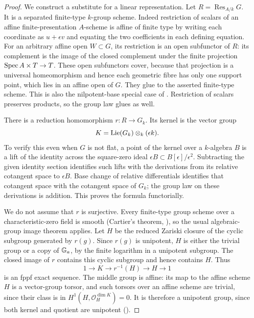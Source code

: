 \begin{proof}
We construct a substitute for a linear representation.
Let $R=\operatorname{Res}_{A/k}G$. It is a separated
finite-type $k$-group scheme. Indeed restriction of
scalars of an affine finite-presentation $A$-scheme
is affine of finite type by writing each coordinate
as $u+\epsilon v$ and equating the two coefficients
in each defining equation. For an arbitrary affine
open $W\subset G$, its restriction is an open
subfunctor of $R$: its complement is the image of
the closed complement under the finite projection
$\operatorname{Spec} A\times T\to T$. These open subfunctors cover,
because that projection is a universal homeomorphism
and hence each geometric fibre has only one support
point, which lies in an affine open of $G$.
They glue to the asserted finite-type scheme.
This is also the nilpotent-base special case of
\citet[Proposition 97.11.5, Tag 05Y8]{D_StacksRestriction}.
Restriction of scalars preserves products, so the
group law glues as well.

There is a reduction homomorphism $r:R\to G_k$.
Its kernel is the vector group
\[
 K=\operatorname{Lie}(G_k)\otimes_k(\epsilon k).
\]
To verify this even when $G$ is not flat, a point
of the kernel over a $k$-algebra $B$ is a lift of
the identity across the square-zero ideal
$\epsilon B\subset B[\epsilon]/\epsilon^2$.
Subtracting the given identity section identifies
such lifts with the derivations from its relative
cotangent space to $\epsilon B$. Base change of
relative differentials identifies that cotangent
space with the cotangent space of $G_k$; the group
law on these derivations is addition. This proves
the formula functorially.

We do not assume that $r$ is surjective. Every
finite-type group scheme over a characteristic-zero
field is smooth (Cartier's theorem,
\citealp[Lemma 39.8.2, Tag 047N]{D_StacksCartier}),
so the usual algebraic-group image theorem applies.
Let $H$ be the reduced Zariski closure of the
cyclic subgroup generated by $r(g)$. Since $r(g)$
is unipotent, $H$ is either the trivial group or
a copy of $\mathbb G_a$, by the finite logarithm in a
unipotent subgroup. The closed image of $r$
contains this cyclic subgroup and hence contains
$H$. Thus
\[
 1\longrightarrow K\longrightarrow r^{-1}(H)
           \longrightarrow H\longrightarrow1
\]
is an fppf exact sequence. The middle group is
affine: its map to the affine scheme $H$ is a
vector-group torsor, and such torsors over an
affine scheme are trivial, since their class is
in $H^1(H,\mathcal O_H^{\dim K})=0$.
It is therefore a unipotent group, since both
kernel and quotient are unipotent
(\citealp[Corollary 14.7]{D_Milne2022}).


\end{proof}

